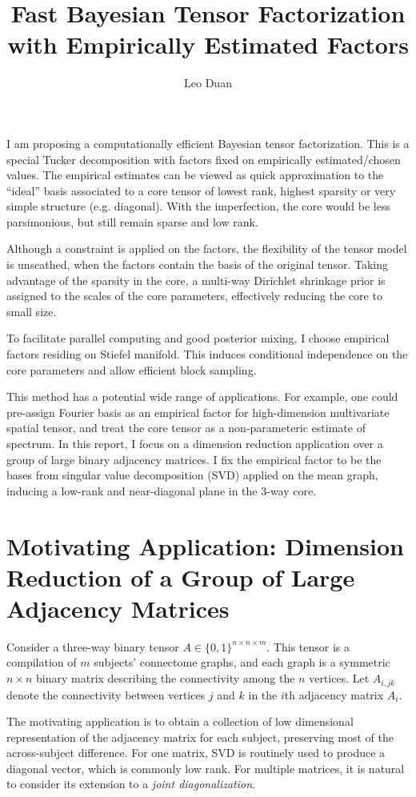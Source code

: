 \documentclass[10pt]{article}
\title{\textbf{Fast Bayesian Tensor Factorization\\ with Empirically Estimated Factors}}
\author{Leo Duan}
\date{}
\begin{document}
\maketitle

I am proposing a computationally efficient Bayesian tensor factorization. This is a special Tucker decomposition with factors fixed on empirically estimated/chosen values. The empirical estimates can be viewed as quick approximation to the ``ideal'' basis associated to a core tensor of lowest rank, highest sparsity or very simple structure (e.g. diagonal). With the imperfection, the core would be less parsimonious, but still remain sparse and low rank.

Although a constraint is applied on the factors, the flexibility of the tensor model is unscathed, when the factors contain the basis of the original tensor. Taking advantage of the sparsity in the core, a multi-way Dirichlet shrinkage prior is assigned to the scales of the core parameters, effectively reducing the core to small size.

To facilitate parallel computing and good posterior mixing, I choose empirical factors residing on Stiefel manifold. This induces conditional independence on the core parameters and allow efficient block sampling.

This method has a potential wide range of applications. For example, one could pre-assign Fourier basis as an empirical factor for high-dimension multivariate spatial tensor, and treat the core tensor as a non-parameteric estimate of spectrum. In this report, I focus on a dimension reduction application over a group of large binary adjacency matrices. I fix the empirical factor to be the bases from singular value decomposition (SVD) applied on the mean graph, inducing a low-rank and near-diagonal plane in the 3-way core.

\section{Motivating Application: Dimension Reduction of a Group of Large Adjacency Matrices}

Consider a three-way binary tensor $A\in \{0,1\}^{n\times n \times m}$. This tensor is a compilation of $m$ subjects' connectome graphs, and each graph is a symmetric $n\times n$ binary matrix describing the connectivity among the $n$ vertices. Let $A_{i,jk}$ denote the connectivity between vertices $j$ and $k$ in the $i$th adjacency matrix $A_{i}$.

The motivating application is to obtain a collection of low dimensional representation of the adjacency matrix for each subject, preserving most of the across-subject difference. For one matrix, SVD is routinely used to produce a diagonal vector, which is commonly low rank. For multiple matrices, it is natural to consider its extension to a {\it joint diagonalization}.
\end{document}
